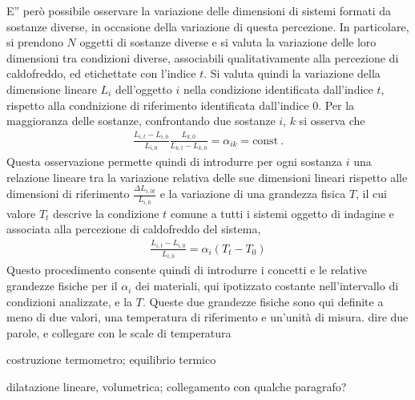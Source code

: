 \documentclass[letterpaper,10pt,italian]{jupyterBook}
\begin{document}
\sphinxAtStartPar
E” però possibile osservare la variazione delle dimensioni di sistemi formati da sostanze diverse, in occasione della variazione di questa percezione.
In particolare, si prendono \(N\) oggetti di sostanze diverse e si valuta la variazione delle loro dimensioni tra condizioni diverse, associabili qualitativamente alla percezione di caldo\sphinxhyphen{}freddo, ed etichettate con l’indice \(t\). Si valuta quindi la variazione della dimensione lineare \(L_i\) dell’oggetto \(i\) nella condizione identificata dall’indice \(t\), rispetto alla condnizione di riferimento identificata dall’indice \(0\). Per la maggioranza delle sostanze, confrontando due sostanze \(i\), \(k\) si osserva che
\begin{equation*}
\begin{split}\frac{L_{i,t} - L_{i,0}}{L_{i,0}} \frac{L_{k,0}}{L_{k,t}- L_{k,0}} = \alpha_{ik} = \text{const} \ .\end{split}
\end{equation*}
\sphinxAtStartPar
Questa osservazione permette quindi di introdurre per ogni sostanza \(i\) una relazione lineare tra la variazione relativa delle sue dimensioni lineari rispetto alle dimensioni di riferimento \(\frac{\Delta L_{i, 0t}}{L_{i,0}}\) e la variazione di una grandezza fisica \(T\), il cui valore \(T_t\) descrive la condizione \(t\) comune a tutti i sistemi oggetto di indagine e associata alla percezione di caldo\sphinxhyphen{}freddo del sistema,
\begin{equation*}
\begin{split}\frac{L_{i,t}-L_{i,0}}{L_{i,0}} = \alpha_i (T_t-T_0)\end{split}
\end{equation*}
\sphinxAtStartPar
Questo procedimento consente quindi di introdurre i concetti e le relative grandezze fisiche per il  \(\alpha_i\) dei materiali, qui ipotizzato costante nell’intervallo di condizioni analizzate, e la  \(T\). Queste due grandezze fisiche sono qui definite a meno di due valori, una temperatura di riferimento e un’unità di misura.  dire due parole, e collegare con le scale di temperatura

\sphinxAtStartPar
{} costruzione termometro; equilibrio termico

\sphinxAtStartPar
{} dilatazione lineare, volumetrica; collegamento con qualche paragrafo?
\end{document}
